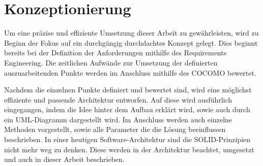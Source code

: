\chapter{Konzeptionierung}
Um eine präzise und effiziente Umsetzung dieser Arbeit zu gewährleisten, wird zu Beginn der Fokus auf ein durchgängig durchdachtes Konzept gelegt. Dies beginnt bereits bei der Definition der Anforderungen mithilfe des Requirements Engineering. Die zeitlichen Aufwände zur Umsetzung der definierten auszuarbeitenden Punkte werden im Anschluss mithilfe des \ac{COCOMO} bewertet.

Nachdem die einzelnen Punkte definiert und bewertet sind, wird eine möglichst effiziente und passende Architektur entworfen. Auf diese wird ausführlich eingegangen, indem die Idee hinter dem Aufbau erklärt wird, sowie auch durch ein \ac{UML}-Diagramm dargestellt wird. Im Anschluss werden auch einzelne Methoden vorgestellt, sowie alle Parameter die die Lösung beeinflussen beschrieben. In einer heutigen Software-Architektur sind die SOLID-Prinzipien nicht mehr weg zu denken. Diese werden in der Architektur beachtet, umgesetzt und auch in dieser Arbeit beschrieben.



%




